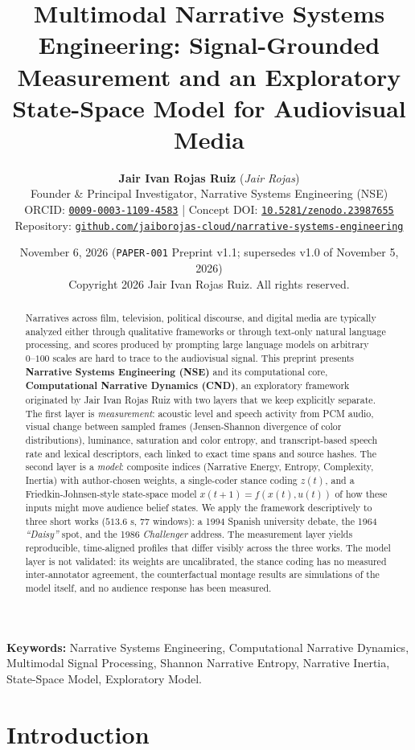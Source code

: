 \documentclass[10pt,letterpaper]{article}
\title{\textbf{Multimodal Narrative Systems Engineering: Signal-Grounded Measurement and an Exploratory State-Space Model for Audiovisual Media}}
\author{
  \textbf{Jair Ivan Rojas Ruiz} (\emph{Jair Rojas})\\
  Founder \& Principal Investigator, Narrative Systems Engineering (NSE)\\
  ORCID: \href{https://orcid.org/0009-0003-1109-4583}{\texttt{0009-0003-1109-4583}} \quad|\quad
  Concept DOI: \href{https://doi.org/10.5281/zenodo.23987655}{\texttt{10.5281/zenodo.23987655}}\\
  Repository: \href{https://github.com/jaiborojas-cloud/narrative-systems-engineering}{\texttt{github.com/jaiborojas-cloud/narrative-systems-engineering}}
}
\date{November 6, 2026 \quad(\texttt{PAPER-001} Preprint v1.1; supersedes v1.0 of November 5, 2026)\\\small Copyright 2026 Jair Ivan Rojas Ruiz. All rights reserved.}
\begin{document}
\maketitle

\begin{abstract}
\noindent
Narratives across film, television, political discourse, and digital media are typically analyzed either through qualitative frameworks or through text-only natural language processing, and scores produced by prompting large language models on arbitrary $0\text{--}100$ scales are hard to trace to the audiovisual signal. This preprint presents \textbf{Narrative Systems Engineering (NSE)} and its computational core, \textbf{Computational Narrative Dynamics (CND)}, an exploratory framework originated by Jair Ivan Rojas Ruiz \cite{RojasRuiz2026NSE} with two layers that we keep explicitly separate. The first layer is \emph{measurement}: acoustic level and speech activity from PCM audio, visual change between sampled frames (Jensen-Shannon divergence of color distributions), luminance, saturation and color entropy, and transcript-based speech rate and lexical descriptors, each linked to exact time spans and source hashes. The second layer is a \emph{model}: composite indices (Narrative Energy, Entropy, Complexity, Inertia) with author-chosen weights, a single-coder stance coding $z(t)$, and a Friedkin-Johnsen-style state-space model $x(t+1) = f(x(t), u(t))$ of how these inputs might move audience belief states. We apply the framework descriptively to three short works ($513.6\text{ s}$, $77$ windows): a 1994 Spanish university debate, the 1964 \emph{``Daisy''} spot, and the 1986 \emph{Challenger} address. The measurement layer yields reproducible, time-aligned profiles that differ visibly across the three works. The model layer is not validated: its weights are uncalibrated, the stance coding has no measured inter-annotator agreement, the counterfactual montage results are simulations of the model itself, and no audience response has been measured.
\end{abstract}

\noindent\textbf{Keywords:} Narrative Systems Engineering, Computational Narrative Dynamics, Multimodal Signal Processing, Shannon Narrative Entropy, Narrative Inertia, State-Space Model, Exploratory Model.

\section{Introduction}
\end{document}
